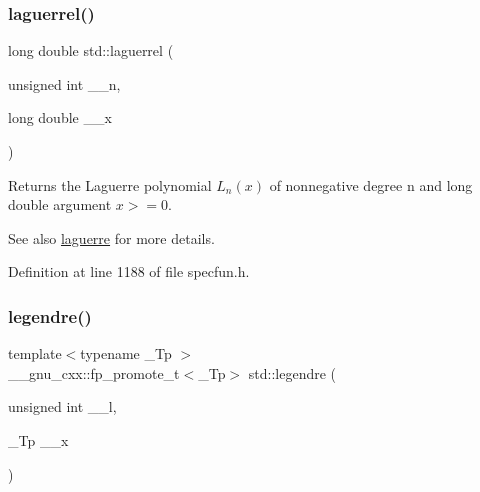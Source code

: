 \mbox{\label{group__mathsf__std_gaaf8b141edf9163b37ea4f2ed3e0191fc}} 
\subsubsection{\texorpdfstring{laguerrel()}{laguerrel()}}
{\footnotesize\ttfamily long double std\+::laguerrel (\begin{DoxyParamCaption}\item[{unsigned int}]{\+\_\+\+\_\+n,  }\item[{long double}]{\+\_\+\+\_\+x }\end{DoxyParamCaption})\hspace{0.3cm}{\ttfamily [inline]}}

Returns the Laguerre polynomial $ L_n(x) $ of nonnegative degree {\ttfamily n} and {\ttfamily long double} argument $ x >= 0 $.

\begin{DoxySeeAlso}{See also}
\hyperlink{group__mathsf__std_ga9d7b24a11dad27690387405548973ef9}{laguerre} for more details. 
\end{DoxySeeAlso}


Definition at line 1188 of file specfun.\+h.

\mbox{\label{group__mathsf__std_gad06811f4e139b0ba84235c1f0d34d86e}} 
\subsubsection{\texorpdfstring{legendre()}{legendre()}}
{\footnotesize\ttfamily template$<$typename \+\_\+\+Tp $>$ \\
\+\_\+\+\_\+gnu\+\_\+cxx\+::fp\+\_\+promote\+\_\+t$<$\+\_\+\+Tp$>$ std\+::legendre (\begin{DoxyParamCaption}\item[{unsigned int}]{\+\_\+\+\_\+l,  }\item[{\+\_\+\+Tp}]{\+\_\+\+\_\+x }\end{DoxyParamCaption})\hspace{0.3cm}{\ttfamily [inline]}}


